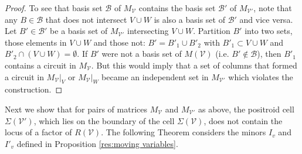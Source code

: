 \documentclass[11pt]{article}
\newcommand{\cV}{\mathcal{V}}
\newcommand{\cB}{\mathcal{B}}
\newcommand{\Rows}{\textrm{Row}}
\theoremstyle{remark}
\theoremstyle{definition}
\begin{document}
\begin{proof}
\begin{comment}
\emph{Proof of claim:}Suppose, for contractiction, $I_j = I'_j$. Write $I_j = v_1 \ldots v_k$ with $v_i <_j v_{i+1}$. By definition fo the Grassmann Necklace, $a$ is the first column in the $>_j$ ordering of the columns of $C$ that is not contained in the flat defined by previous elements of $I_j$: $\textrm{cl}(\{v_i | v_i <_j a \})$ in $M(C)$. In $C'$, the non-zero entries in the column $a$ lie in the rows where $V$ has non-zero entries: $\Rows(a) \subset \Rows(V)$. Since $a \in I'_j$, the flat $V \cup W$ in $M(C')$ is not contained in the the flat defined by the previous elements of $I'_j$: $V \cup W \not \subset \textrm{cl}(\{v_i | v_i <_j a )$ in $M(C')$. Since $\Rows(V \cup W)$ in $C'$ is the same as $\Rows(V)$ in $C$, the flat defined by $V$ in $M(C)$ is is not contained in the the flat defined by the previous elements of $I_j$: $V\not \subset \textrm{cl}(\{v_i | v_i <_j a ) \}$ in $M(C)$. \todo{is $U$ uniquely defined?} Let $U \subset I_j$ be the smallest subset of $I_j$ that is needed to ensure that $V \subset \textrm{cl}(\{v_i | v_i <_j a \} \cup U)$ in $M(C)$. Note that $a$ preceeds all elements of $U$, by construction s $a \leq_j u$ for all $u \in U$ in $M(C)$. However, also by construction, $a \in U$ in $M(C')$. Therefore, there must be some $b \in U$ that is in $M(C)$ but not in $M(C')$, thus violating $I_j = I'_j$.
\end{comment} 

To see that basis set $\cB$ of $M_\cV$ contains the basis set $\cB'$ of $M_{\cV'}$, note that any $B \in \cB$ that does not intersect $V \cup W$ is also a basis set of $\cB'$ and vice versa. Let $B' \in \cB'$ be a basis set of $M_{\cV'}$ intersecting $V\cup W$. Partition $B'$ into two sets, those elements in $V \cup W$  and those not: $B' = B'_1 \cup B'_2$ with $B'_1 \subset V \cup W$ and $B'_2 \cap (V \cup W) = \emptyset$. If $B'$ were not a basis set of $M(\cV)$ (i.e. $B' \not \in \cB$), then $B'_1$ contains a circuit in $M_\cV$. But this would imply that a set of columns that formed a circuit in $M_{\cV}|_V$ or $M_\cV|_W$ became an independent set in $M_{\cV'}$ which violates the construction.
\end{proof}

Next we show that for pairs of matrices $M_{\cV}$ and $M_{\cV'}$ as above, the positroid cell $\Sigma(\cV')$, which lies on the boundary of the cell $\Sigma(\cV)$, does not contain the locus of a factor of $R(\cV)$. The following Theorem considers the minors $I_v$ and $I'_v$ defined in Proposition \ref{res:moving variables}. 
\end{document}
